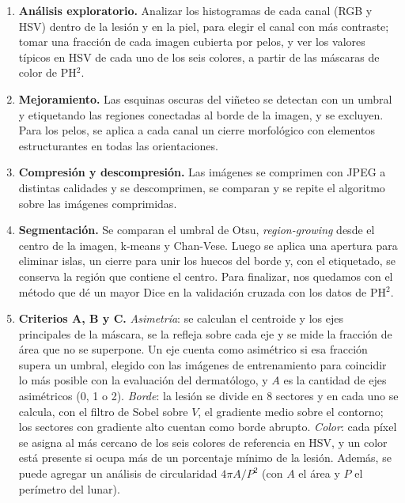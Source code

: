 \documentclass[11pt,a4paper]{article}
\begin{document}
\begin{enumerate}[label=\arabic*., leftmargin=1.6em, itemsep=6pt, topsep=4pt]
\item \textbf{Análisis exploratorio.} Analizar los histogramas de cada
  canal (RGB y HSV) dentro de la lesión y en la piel, para elegir el
  canal con más contraste; tomar una fracción de cada imagen cubierta por
  pelos, y ver los valores típicos en HSV de cada uno de los seis
  colores, a partir de las máscaras de color de PH$^2$.

\item \textbf{Mejoramiento.} Las esquinas oscuras del viñeteo se detectan
  con un umbral y etiquetando las regiones conectadas al borde de la
  imagen, y se excluyen. Para los pelos, se aplica a cada canal un cierre
  morfológico con elementos estructurantes en todas las orientaciones.

\item \textbf{Compresión y descompresión.} Las imágenes se comprimen con
  JPEG a distintas calidades y se descomprimen, se comparan y se repite
  el algoritmo sobre las imágenes comprimidas.

\item \textbf{Segmentación.} Se comparan el umbral de Otsu,
  \emph{region-growing} desde el centro de la imagen, k-means y
  Chan-Vese. Luego se aplica una apertura para eliminar islas, un cierre
  para unir los huecos del borde y, con el etiquetado, se conserva la
  región que contiene el centro. Para finalizar, nos quedamos con el
  método que dé un mayor Dice en la validación cruzada con los datos de
  PH$^2$.

\item \textbf{Criterios A, B y C.} \emph{Asimetría}: se calculan el
  centroide y los ejes principales de la máscara, se la refleja sobre
  cada eje y se mide la fracción de área que no se superpone. Un eje
  cuenta como asimétrico si esa fracción supera un umbral, elegido con
  las imágenes de entrenamiento para coincidir lo más posible con la
  evaluación del dermatólogo, y $A$ es la cantidad de ejes asimétricos
  (0, 1 o 2). \emph{Borde}: la lesión se divide en 8 sectores y en cada
  uno se calcula, con el filtro de Sobel sobre $V$, el gradiente medio
  sobre el contorno; los sectores con gradiente alto cuentan como borde
  abrupto. \emph{Color}: cada píxel se asigna al más cercano de los seis
  colores de referencia en HSV, y un color está presente si ocupa más de
  un porcentaje mínimo de la lesión. Además, se puede agregar un análisis
  de circularidad $4\pi A/P^2$ (con $A$ el área y $P$ el perímetro del
  lunar).


\end{enumerate}
\end{document}
